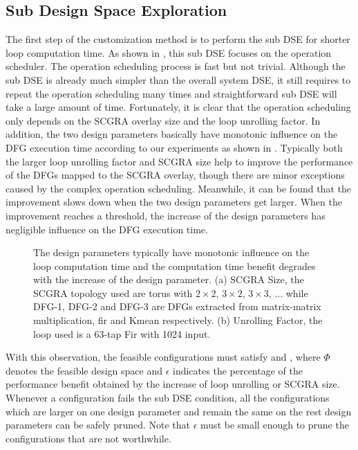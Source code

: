 \subsection{Sub Design Space Exploration}
The first step of the customization method is to perform the sub DSE for shorter loop computation time. As shown in , this sub DSE focuses on the operation scheduler. The operation scheduling process is fast but not trivial. Although the sub DSE is already much simpler than the overall system DSE, it still requires to repeat the operation scheduling many times and straightforward sub DSE will take a large amount of time. Fortunately, it is clear that the operation scheduling only depends on the SCGRA overlay size and the loop unrolling factor. In addition, the two design parameters basically have monotonic influence on the DFG execution time according to our experiments as shown in . Typically both the larger loop unrolling factor and SCGRA size help to improve the performance of the DFGs mapped to the SCGRA overlay, though there are minor exceptions caused by the complex operation scheduling. Meanwhile, it can be found that the improvement slows down when the two design parameters get larger. When the improvement reaches a threshold, the increase of the design parameters has negligible influence on the DFG execution time. 

\begin{figure}[tb]
    \centering
    \hfill
    \caption{The design parameters typically have monotonic influence on the
        loop computation time and the computation time benefit degrades with 
    the increase of the design parameter. (a) SCGRA Size, the SCGRA topology used are torus with $2
\times 2$, $3 \times 2$, $3 \times 3$, ... while DFG-1, DFG-2 and DFG-3 are DFGs extracted from
matrix-matrix multiplication, fir and Kmean respectively. (b) Unrolling Factor, the loop used is a
63-tap Fir with 1024 input.} 
    \label{fig:observation}
  \end{figure}

With this observation, the feasible configurations must satisfy  and , where $\Phi$ denotes the feasible design space and $\epsilon$ indicates the percentage of the performance benefit obtained by the increase of loop unrolling or SCGRA size. Whenever a configuration fails the sub DSE condition, all the configurations which are larger on one design parameter and remain the same on the rest design parameters can be safely pruned. Note that $\epsilon$ must be small enough to prune the configurations that are not worthwhile.

